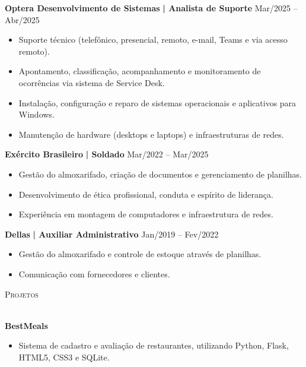 \documentclass[a4paper]{article}
\newcommand{\lineunder}{
    \vspace*{-8pt} \\
    \hspace*{-18pt} \hrulefill \\
}
\newcommand{\header}[1]{
    {\hspace*{-18pt}\vspace*{6pt} \textsc{#1}}
    \vspace*{-6pt} \lineunder
}
\begin{document}
    \textbf{Optera Desenvolvimento de Sistemas}\textbf{ | Analista de Suporte} \hfill  Mar/2025 – Abr/2025\\
    \vspace{-3mm}
    \begin{itemize} \itemsep -3pt
        \item Suporte técnico (telefônico, presencial, remoto, e-mail, Teams e via acesso remoto).
        \item Apontamento, classificação, acompanhamento e monitoramento de ocorrências via sistema de Service Desk.
        \item Instalação, configuração e reparo de sistemas operacionais e aplicativos para Windows.
        \item Manutenção de hardware (desktops e laptops) e infraestruturas de redes.
    \end{itemize}

    \textbf{Exército Brasileiro}\textbf{ | Soldado} \hfill  Mar/2022 – Mar/2025\\
    \vspace{-3mm}
    \begin{itemize} \itemsep -3pt
        \item Gestão do almoxarifado, criação de documentos e gerenciamento de planilhas.
        \item Desenvolvimento de ética profissional, conduta e espírito de liderança.
        \item Experiência em montagem de computadores e infraestrutura de redes.
    \end{itemize}

    \textbf{Dellas}\textbf{ | Auxiliar Administrativo} \hfill  Jan/2019 – Fev/2022\\
    \vspace{-3mm}
    \begin{itemize} \itemsep -3pt
        \item Gestão do almoxarifado e controle de estoque através de planilhas.
        \item Comunicação com fornecedores e clientes.
    \end{itemize}

    \header{Projetos}
    \vspace{2mm}
    
    \textbf{BestMeals}\\
    \vspace{-3mm}
    \begin{itemize} \itemsep -3pt
        \item Sistema de cadastro e avaliação de restaurantes, utilizando Python, Flask, HTML5, CSS3 e SQLite.
    \end{itemize}
    
\end{document}
